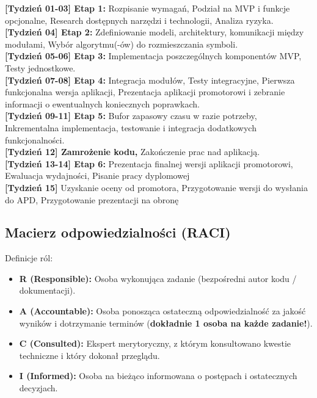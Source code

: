\documentclass[a4paper,11pt]{article}
\begin{document}
\noindent\textbf{[Tydzień 01-03] Etap 1:} Rozpisanie wymagań, Podział na MVP i funkcje opcjonalne, Research dostępnych narzędzi i technologii, Analiza ryzyka. \\
\noindent\textbf{[Tydzień 04] Etap 2:} Zdefiniowanie modeli, architektury, komunikacji między modułami, Wybór algorytmu(-ów) do rozmieszczania symboli. \\
\noindent\textbf{[Tydzień 05-06] Etap 3:} Implementacja poszczególnych komponentów MVP, Testy jednostkowe. \\
\noindent\textbf{[Tydzień 07-08] Etap 4:} Integracja modułów, Testy integracyjne, Pierwsza funkcjonalna wersja aplikacji, Prezentacja aplikacji promotorowi i zebranie informacji o ewentualnych koniecznych poprawkach. \\
\noindent\textbf{[Tydzień 09-11] Etap 5:} Bufor zapasowy czasu w razie potrzeby, Inkrementalna implementacja, testowanie i integracja dodatkowych funkcjonalności. \\
\noindent\textbf{[Tydzień 12] Zamrożenie kodu,} Zakończenie prac nad aplikacją. \\
\noindent\textbf{[Tydzień 13-14] Etap 6:} Prezentacja finalnej wersji aplikacji promotorowi, Ewaluacja wydajności, Pisanie pracy dyplomowej \\
\noindent\textbf{[Tydzień 15]} Uzyskanie oceny od promotora, Przygotowanie wersji do wysłania do APD, Przygotowanie prezentacji na obronę

\subsection{Macierz odpowiedzialności (RACI)}

Definicje ról:

\begin{itemize}
  \item \textbf{R (Responsible):} Osoba wykonująca zadanie (bezpośredni autor kodu / dokumentacji).
  \item \textbf{A (Accountable):} Osoba ponosząca ostateczną odpowiedzialność za jakość wyników i dotrzymanie terminów (\textbf{dokładnie 1 osoba na każde zadanie!}).
  \item \textbf{C (Consulted):} Ekspert merytoryczny, z którym konsultowano kwestie techniczne i który dokonał przeglądu.
  \item \textbf{I (Informed):} Osoba na bieżąco informowana o postępach i ostatecznych decyzjach.
\end{itemize}
\end{document}
